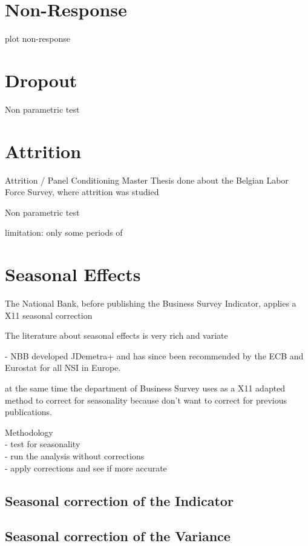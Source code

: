 \documentclass[12pt,a4paper,oneside]{book}
\begin{document}
\section{Non-Response}

plot non-response


\newpage
\section{Dropout}

Non parametric test \cite{das_nonparametric_2011}


\newpage
\section{Attrition}
Attrition / Panel Conditioning 
Master Thesis done about the Belgian Labor Force Survey, where  attrition was studied \cite{priyana_hardjawidjaksana_investigating_2019}

Non parametric test \cite{das_nonparametric_2011}


limitation: only some periods of 


\newpage
\section{Seasonal Effects}
The National Bank, before publishing the Business Survey Indicator, applies a X11 seasonal correction

The literature about seasonal effects is very rich and variate

- NBB developed JDemetra+ and has since been recommended by the ECB and Eurostat for all NSI in Europe.


at the same time the department of Business Survey uses as a X11 adapted method to correct for seasonality because don't want to correct for previous publications.


Methodology \\
- test for seasonality \\
- run the analysis without corrections \\
- apply corrections and see if more accurate \\

\subsection*{Seasonal correction of the Indicator}

\subsection*{Seasonal correction of the Variance}
\end{document}
